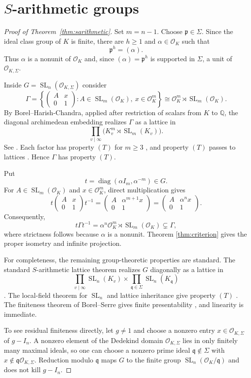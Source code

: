 \documentclass[11pt]{article}
\newcommand{\Q}{\mathbb Q}
\newcommand{\OK}{\mathcal O_K}
\newcommand{\OS}{\mathcal O_{K,\Sigma}}
\newcommand{\SL}{\operatorname{SL}}
\begin{document}
\section{\texorpdfstring{$S$}{S}-arithmetic groups}\label{sec:arithmetic}

\begin{proof}[Proof of Theorem~\ref{thm:sarithmetic}]
Set $m=n-1$.  Choose $\mathfrak p\in\Sigma$.  Since the ideal class group
of $K$ is finite, there are $h\geq1$ and $\alpha\in\OK$ such that
\[
 \mathfrak p^h=(\alpha).
\]
Thus $\alpha$ is a nonunit of $\OK$ and, since $(\alpha)=\mathfrak p^h$
is supported in $\Sigma$, a unit of $\OS$.

Inside $G=\SL_n(\OS)$ consider
\[
 \Gamma=
 \left\{
 \begin{pmatrix}A&x\\0&1\end{pmatrix}:
 A\in\SL_m(\OK),\ x\in\OK^m
 \right\}
 \cong \OK^m\rtimes\SL_m(\OK).
\]
By Borel--Harish-Chandra, applied after restriction of scalars from $K$ to
$\Q$, the diagonal archimedean embedding realizes $\Gamma$ as a lattice in
\[
 \prod_{v\mid\infty}
 \bigl(K_v^m\rtimes\SL_m(K_v)\bigr).
\]
See \cite{BorelHarishChandra}.
Each factor has property $(T)$ for $m\geq3$
\cite[Corollary~1.4.16]{BHV}, and property $(T)$ passes to lattices
\cite[Theorem~1.7.1]{BHV}.  Hence $\Gamma$ has property $(T)$.

Put
\[
 t=\operatorname{diag}(\alpha I_m,\alpha^{-m})\in G.
\]
For $A\in\SL_m(\OK)$ and $x\in\OK^m$, direct multiplication gives
\[
 t\begin{pmatrix}A&x\\0&1\end{pmatrix}t^{-1}
 =\begin{pmatrix}A&\alpha^{m+1}x\\0&1\end{pmatrix}
 =\begin{pmatrix}A&\alpha^n x\\0&1\end{pmatrix}.
\]
Consequently,
\[
 t\Gamma t^{-1}
 =\alpha^n\OK^m\rtimes\SL_m(\OK)
 \subsetneq\Gamma,
\]
where strictness follows because $\alpha$ is a nonunit.  Theorem
\ref{thm:criterion} gives the proper isometry and infinite projection.

For completeness, the remaining group-theoretic properties are standard.
The standard $S$-arithmetic lattice theorem realizes $G$ diagonally as a
lattice in
\[
 \prod_{v\mid\infty}\SL_n(K_v)
 \times\prod_{\mathfrak q\in\Sigma}\SL_n(K_{\mathfrak q})
\]
\cite{BorelSerre}.  The local-field theorem for $\SL_n$ and
lattice inheritance give property $(T)$
\cite[Theorems~1.4.15 and~1.7.1]{BHV}.  The finiteness theorem of
Borel--Serre gives finite presentability \cite{BorelSerre}, and linearity is
immediate.

To see residual finiteness directly, let $g\neq1$ and choose a nonzero entry
$x\in\OS$ of $g-I_n$.  A nonzero element of the Dedekind domain $\OS$ lies
in only finitely many maximal ideals, so one can choose a nonzero prime ideal
$\mathfrak q\notin\Sigma$ with $x\notin\mathfrak q\OS$.  Reduction modulo
$\mathfrak q$ maps $G$ to the finite group $\SL_n(\OK/\mathfrak q)$ and
does not kill $g-I_n$.
\end{proof}
\end{document}
